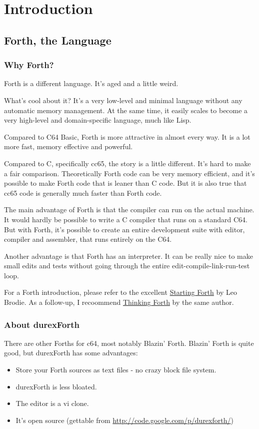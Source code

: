 \chapter{Introduction}

\section{Forth, the Language}

\subsection{Why Forth?}

Forth is a different language. It's aged and a little weird.

What's cool about it? It's a very low-level and minimal language without any automatic memory management. At the same time, it easily scales to become a very high-level and domain-specific language, much like Lisp. 

Compared to C64 Basic, Forth is more attractive in almost every way. It is a lot more fast, memory effective and powerful.

Compared to C, specifically cc65, the story is a little different. It's hard to make a fair comparison. Theoretically Forth code can be very memory efficient, and it's possible to make Forth code that is leaner than C code. But it is also true that cc65 code is generally much faster than Forth code.

The main advantage of Forth is that the compiler can run on the actual machine. It would hardly be possible to write a C compiler that runs on a standard C64. But with Forth, it's possible to create an entire development suite with editor, compiler and assembler, that runs entirely on the C64.

Another advantage is that Forth has an interpreter. It can be really nice to make small edits and tests without going through the entire edit-compile-link-run-test loop.

For a Forth introduction, please refer to the excellent \href{http://www.forth.com/starting-forth/}{Starting Forth} by Leo Brodie. As a follow-up, I recoommend \href{http://thinking-forth.sourceforge.net/}{Thinking Forth} by the same author.

\subsection{About durexForth}

There are other Forths for c64, most notably Blazin' Forth. Blazin' Forth is quite good, but durexForth has some advantages:

\begin{itemize}
\item Store your Forth sources as text files - no crazy block file system.
\item durexForth is less bloated.
\item The editor is a vi clone.
\item It's open source (gettable from \url{http://code.google.com/p/durexforth/})
\end{itemize}
